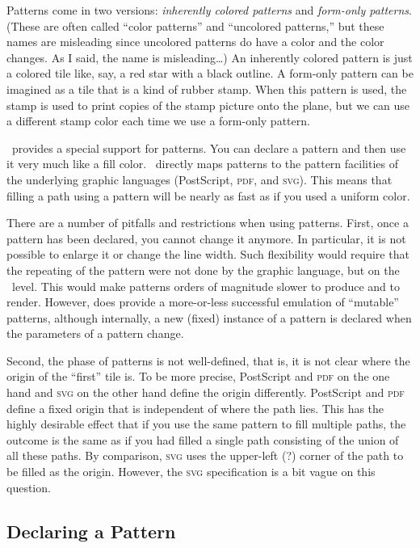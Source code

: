 Patterns come in two versions: \emph{inherently colored patterns} and
\emph{form-only patterns}. (These are often called ``color patterns''
and ``uncolored patterns,'' but these names are misleading since
uncolored patterns do have a color and the color changes. As I said,
the name is misleading\dots) An inherently colored pattern is just a
colored tile like, say, a red star with a black outline. A form-only
pattern can be imagined as a tile that is a kind of rubber stamp. When
this pattern is used, the stamp is used to print copies of the stamp
picture onto the plane, but we can use a different stamp color each
time we use a form-only pattern.

\pgfname\ provides a special support for patterns. You can declare a
pattern and then use it very much like a fill color. \pgfname\
directly maps patterns to the pattern facilities of the underlying
graphic languages (PostScript, \textsc{pdf}, and \textsc{svg}). This
means that filling a path using a pattern will be nearly as fast as if
you used a uniform color.

There are a number of pitfalls and restrictions when using
patterns. First, once a pattern has been declared, you cannot change
it anymore. In particular, it is not possible to enlarge it or change
the line width. Such flexibility would require that the repeating of
the pattern were not done by the graphic language, but on the
\pgfname\ level. This would make patterns orders of magnitude slower
to produce and to render. However, \pgfname{} does provide a
more-or-less successful emulation of ``mutable'' patterns, although
internally, a new (fixed) instance of a pattern is declared when
the parameters of a pattern change.

Second, the phase of patterns is not well-defined, that is, it is not
clear where the origin of the ``first'' tile is. To be more precise,
PostScript and \textsc{pdf} on the one hand and \textsc{svg} on the
other hand define the origin differently. PostScript and \textsc{pdf}
define a fixed origin that is independent of where the path lies. This
has the highly desirable effect that if you use the same pattern to
fill multiple paths, the outcome is the same as if you had filled a single path consisting of the union of all these paths. By
comparison, \textsc{svg} uses the upper-left (?) corner of the path to
be filled as the origin. However, the \textsc{svg} specification is a
bit vague on this question.


\subsection{Declaring a Pattern}

